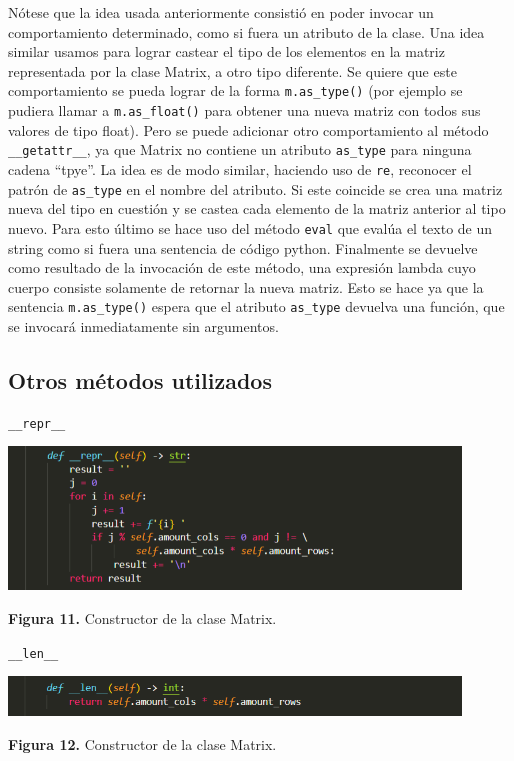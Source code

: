 \documentclass[10pt]{article} %
\newcommand{\csl}[1]{\colorbox{backcolour}{\texttt{#1}}}
\newcommand{\imgcaption}[2]{\tiny \textbf{Figura #1.} #2.}
\newcommand{\mgc}[2][]{\colorbox{backcolour}{\texttt{\_\_#2\_\_#1}}}
\begin{document}
N\'otese que la idea usada anteriormente consisti\'o en poder invocar un comportamiento determinado, como si fuera un atributo de la clase. Una idea similar usamos para lograr castear el tipo de los elementos en la matriz representada por la clase Matrix, a otro tipo diferente. Se quiere que este comportamiento se pueda lograr de la forma \csl{m.as\_type()} (por ejemplo se pudiera llamar a \csl{m.as\_float()} para obtener una nueva matriz con todos sus valores de tipo float). Pero se puede adicionar otro comportamiento al m\'etodo \mgc{getattr}, ya que Matrix no contiene un atributo \csl{as\_type} para ninguna cadena ``tpye''. La idea es de modo similar, haciendo uso de \csl{re}, reconocer el patr\'on de \csl{as\_type} en el nombre del atributo. Si este coincide se crea una matriz nueva del tipo en cuesti\'on y se castea cada elemento de la matriz anterior al tipo nuevo. Para esto \'ultimo se hace uso del m\'etodo \csl{eval} que eval\'ua el texto de un string como si fuera una sentencia de c\'odigo python. Finalmente se devuelve como resultado de la invocaci\'on de este m\'etodo, una expresi\'on lambda cuyo cuerpo consiste solamente de retornar la nueva matriz. Esto se hace ya que la sentencia \csl{m.as\_type()} espera que el atributo \csl{as\_type} devuelva una funci\'on, que se invocar\'a inmediatamente sin argumentos.

\subsection{Otros m\'etodos utilizados}

\colorbox{backcolour}{\mgc{repr}}

\begin{center}
	\includegraphics[width=12cm]{repr.png}
	
	\imgcaption{11}{Constructor de la clase Matrix}
\end{center}

\colorbox{backcolour}{\mgc{len}}

\begin{center}
	\includegraphics[width=12cm]{len.png}
	
	\imgcaption{12}{Constructor de la clase Matrix}
\end{center}
\end{document}
